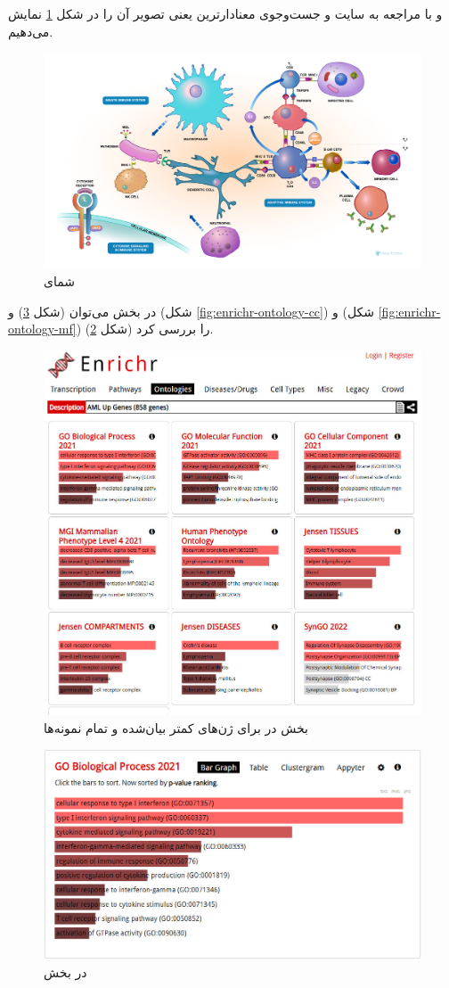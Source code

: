 \documentclass{article}
\begin{document}
و با مراجعه به سایت \href{https://reactome.org}{} و جست‌و‌جوی معنادارترین  یعنی
تصویر آن را در شکل \ref{fig:reactome-pathway} نمایش می‌دهیم.
\begin{figure}[h!]
	\centering
	\includegraphics[width=0.6\columnwidth]{figs/reactome-pathway.pdf}
	\caption{شمای }
	\label{fig:reactome-pathway}
\end{figure}

در بخش  می‌توان  (شکل \ref{fig:enrichr-ontology-bp}) و  (شکل \ref{fig:enrichr-ontology-cc}) و  (شکل \ref{fig:enrichr-ontology-mf}) را بررسی کرد (شکل \ref{fig:enrichr-ontology}).
\begin{figure}[h!]
	\centering
	\includegraphics[width=0.5\columnwidth]{figs/enrichr-ontologies.jpg}
	\caption{بخش  در  برای ژن‌های کمتر بیان‌شده و تمام نمونه‌ها}
	\label{fig:enrichr-ontology}
\end{figure}

\begin{figure}[h!]
	\centering
	\includegraphics[width=0.5\columnwidth]{figs/enrichr-ontologies-bp.jpg}
	\caption{ در بخش }
	\label{fig:enrichr-ontology-bp}
\end{figure}
\end{document}
